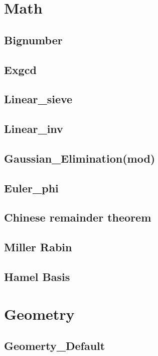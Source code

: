 \section{Math}
    \subsection{Bignumber}
        
    \subsection{Exgcd}
        
    \subsection{Linear\_sieve}
        
    \subsection{Linear\_inv}
        
    \subsection{Gaussian\_Elimination(mod)}
        
    \subsection{Euler\_phi}
        
    \subsection{Chinese remainder theorem}
        
    \subsection{Miller Rabin}
        
    \subsection{Hamel Basis}
        

\section{Geometry}
    \subsection{Geomerty\_Default}
        
